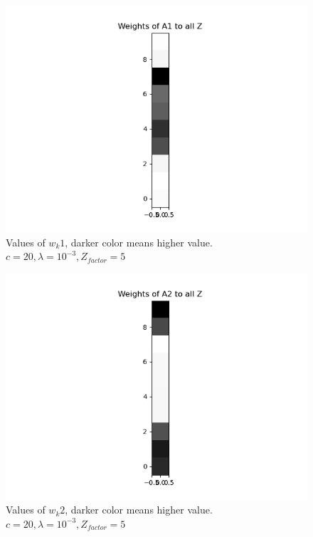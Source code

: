 \begin{figure}
  \includegraphics[width=\linewidth]{figures/horvert/horvert_c20_3_Zfactor5_priorWeight1.png}
  \caption{Values of $w_k1$, darker color means higher value. $c = 20, \lambda = 10^{-3}, Z_{factor} = 5$}
  \label{fig:wkl1}
\end{figure}

\begin{figure}
  \includegraphics[width=\linewidth]{figures/horvert/horvert_c20_3_Zfactor5_priorWeight2.png}
  \caption{Values of $w_k2$, darker color means higher value. $c = 20, \lambda = 10^{-3}, Z_{factor} = 5$}
  \label{fig:wkl2}
\end{figure}


